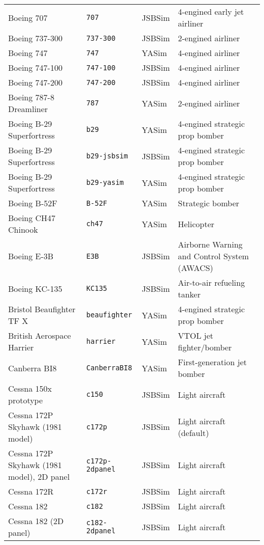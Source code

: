 \begin{tabular}{l|l|l|l}
   Boeing 707       & \texttt{707}        & JSBSim &  4-engined early jet airliner \\
   Boeing 737-300   & \texttt{737-300}    & JSBSim &  2-engined airliner \\
   Boeing 747       & \texttt{747}        & YASim  &  4-engined airliner \\
   Boeing 747-100   & \texttt{747-100}    & JSBSim &  4-engined airliner \\
   Boeing 747-200   & \texttt{747-200}    & JSBSim &  4-engined airliner \\
   Boeing 787-8 Dreamliner & \texttt{787}        & YASim  &  2-engined airliner\\
   Boeing B-29 Superfortress & \texttt{b29} & YASim & 4-engined strategic prop bomber\\
   Boeing B-29 Superfortress & \texttt{b29-jsbsim} & JSBSim & 4-engined strategic prop bomber\\
   Boeing B-29 Superfortress & \texttt{b29-yasim} & YASim & 4-engined strategic prop bomber\\
   Boeing B-52F     & \texttt{B-52F}      & YASim  &  Strategic bomber\\
   Boeing CH47 Chinook & \texttt{ch47} & YASim & Helicopter\\
   Boeing E-3B      & \texttt{E3B}        & JSBSim  &  Airborne Warning and Control System (AWACS)\\
   Boeing KC-135    & \texttt{KC135}      & JSBSim  &  Air-to-air refueling tanker\\
   Bristol Beaufighter TF X & \texttt{beaufighter} & YASim & 4-engined strategic prop bomber\\
   British Aerospace Harrier & \texttt{harrier} & YASim & VTOL jet fighter/bomber\\
   Canberra BI8     & \texttt{CanberraBI8} & YASim &  First-generation jet bomber\\
   Cessna 150x prototype & \texttt{c150} & JSBSim & Light aircraft\\
   Cessna 172P Skyhawk (1981 model) & \texttt{c172p} & JSBSim & Light aircraft (default)\\
   Cessna 172P Skyhawk (1981 model), 2D panel & \texttt{c172p-2dpanel} & JSBSim & Light aircraft\\
   Cessna 172R & \texttt{c172r} & JSBSim & Light aircraft\\
   Cessna 182 & \texttt{c182} & JSBSim & Light aircraft\\
   Cessna 182 (2D panel) & \texttt{c182-2dpanel} & JSBSim & Light aircraft\\

\end{tabular}

